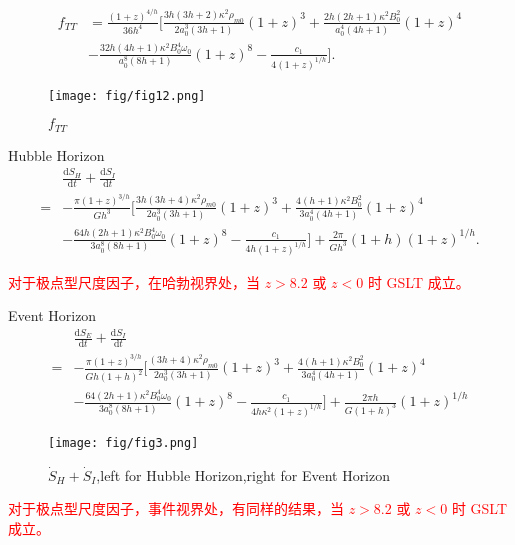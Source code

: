 \documentclass[9pt, dvipsnames]{beamer} %
\begin{document}
\begin{frame}

    $$
    \begin{aligned}
        f_{TT}
        &=\frac{(1+z)^{4/h} }{36h^4 } \bigg[\frac{3h(3h+2)\kappa^2\rho_{m0} }{2a_0^3(3h+1) }(1+z)^3 + \frac{2h(2h+1)\kappa^2 B_0^2 }{a_0^4(4h+1) } (1+z)^4 \\
        &- \frac{32h(4h+1)\kappa^2 B_0^4 \omega_0 }{a_0^8 (8h+1) } (1+z)^8 - \frac{c_1 }{4(1+z)^{1/h} }   \bigg].
    \end{aligned}
    $$
    \begin{figure}
        \centering
        \texttt{[image: fig/fig12.png]}
        \caption{$f_{TT}$}
    \end{figure}   
\end{frame}

\begin{frame}{Hubble Horizon}
    $$
    \begin{aligned}
        &\frac{\mathrm{d}S_H }{\mathrm{d}t } + \frac{\mathrm{d}S_I }{\mathrm{d}t } \\
        =&-\frac{\pi(1+z)^{3/h} }{Gh^3 } \bigg[\frac{3h(3h+4)\kappa^2\rho_{m0} }{2a_0^3(3h+1) }(1+z)^3 + \frac{4(h+1)\kappa^2 B_0^2 }{3a_0^4(4h+1) } (1+z)^4 \\
        &- \frac{64h(2h+1)\kappa^2 B_0^4 \omega_0 }{3a_0^8 (8h+1) } (1+z)^8- \frac{c_1 }{4h(1+z)^{1/h} } \bigg] + \frac{2\pi }{G h^3 } (1+h)(1+z)^{1/h}.
    \end{aligned}
    $$

    \textcolor{red}{对于极点型尺度因子，在哈勃视界处，当 $z>8.2$ 或 $z<0$ 时 GSLT 成立。}

\end{frame}

\begin{frame}{Event Horizon}
    $$
    \begin{aligned}
        &\frac{\mathrm{d}S_E }{\mathrm{d}t } + \frac{\mathrm{d}S_I }{\mathrm{d}t } \\
        =&-\frac{\pi(1+z)^{3/h} }{Gh(1+h)^2 } \bigg[\frac{(3h+4)\kappa^2\rho_{m0} }{2a_0^3(3h+1) }(1+z)^3 + \frac{4(h+1)\kappa^2 B_0^2 }{3a_0^4(4h+1) } (1+z)^4 \\
        &- \frac{64(2h+1)\kappa^2 B_0^4 \omega_0 }{3a_0^8 (8h+1) } (1+z)^8 - \frac{c_1 }{4h\kappa^2(1+z)^{1/h} } \bigg] + \frac{2\pi h }{G (1+h)^3 } (1+z)^{1/h}
    \end{aligned}
    $$

    \begin{figure}
        \centering
        \texttt{[image: fig/fig3.png]}
        \caption{$\dot{S}_H+\dot{S}_I$,left for Hubble Horizon,right for Event Horizon}
    \end{figure}

    \textcolor{red}{对于极点型尺度因子，事件视界处，有同样的结果，当 $z>8.2$ 或 $z<0$ 时 GSLT 成立。}

\end{frame}
\end{document}
